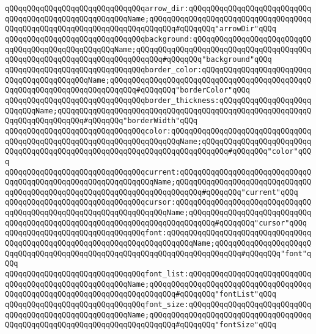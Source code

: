 \verb|qQQqqQQqqQQqqQQqqQQqqQQqqQQqqQQqarrow_dir:qQQqqQQqqQQqqQQqqQQqqQQqqQQqqQQqqQQqqQQqqQQqqQQqqQQqqQQqName;qQQqqQQqqQQqqQQqqQQqqQQqqQQqqQQqqQQqqQQqqQQqqQQqqQQqqQQqqQQqqQQqqQQqqQQqqQQq#qQQqqQQq"arrowDir"qQQq|\newline
\newline
\verb|qQQqqQQqqQQqqQQqqQQqqQQqqQQqqQQqbackground:qQQqqQQqqQQqqQQqqQQqqQQqqQQqqQQqqQQqqQQqqQQqqQQqqQQqName;qQQqqQQqqQQqqQQqqQQqqQQqqQQqqQQqqQQqqQQqqQQqqQQqqQQqqQQqqQQqqQQqqQQqqQQqqQQq#qQQqqQQq"background"qQQq|\newline
\verb|qQQqqQQqqQQqqQQqqQQqqQQqqQQqqQQqborder_color:qQQqqQQqqQQqqQQqqQQqqQQqqQQqqQQqqQQqqQQqqQQqName;qQQqqQQqqQQqqQQqqQQqqQQqqQQqqQQqqQQqqQQqqQQqqQQqqQQqqQQqqQQqqQQqqQQqqQQqqQQq#qQQqqQQq"borderColor"qQQq|\newline
\verb|qQQqqQQqqQQqqQQqqQQqqQQqqQQqqQQqborder_thickness:qQQqqQQqqQQqqQQqqQQqqQQqqQQqName;qQQqqQQqqQQqqQQqqQQqqQQqqQQqqQQqqQQqqQQqqQQqqQQqqQQqqQQqqQQqqQQqqQQqqQQqqQQq#qQQqqQQq"borderWidth"qQQq|\newline
\newline
\verb|qQQqqQQqqQQqqQQqqQQqqQQqqQQqqQQqcolor:qQQqqQQqqQQqqQQqqQQqqQQqqQQqqQQqqQQqqQQqqQQqqQQqqQQqqQQqqQQqqQQqqQQqqQQqName;qQQqqQQqqQQqqQQqqQQqqQQqqQQqqQQqqQQqqQQqqQQqqQQqqQQqqQQqqQQqqQQqqQQqqQQqqQQq#qQQqqQQq"color"qQQq|\newline
\verb|qQQqqQQqqQQqqQQqqQQqqQQqqQQqqQQqcurrent:qQQqqQQqqQQqqQQqqQQqqQQqqQQqqQQqqQQqqQQqqQQqqQQqqQQqqQQqqQQqqQQqName;qQQqqQQqqQQqqQQqqQQqqQQqqQQqqQQqqQQqqQQqqQQqqQQqqQQqqQQqqQQqqQQqqQQqqQQqqQQq#qQQqqQQq"current"qQQq|\newline
\verb|qQQqqQQqqQQqqQQqqQQqqQQqqQQqqQQqcursor:qQQqqQQqqQQqqQQqqQQqqQQqqQQqqQQqqQQqqQQqqQQqqQQqqQQqqQQqqQQqqQQqqQQqName;qQQqqQQqqQQqqQQqqQQqqQQqqQQqqQQqqQQqqQQqqQQqqQQqqQQqqQQqqQQqqQQqqQQqqQQqqQQq#qQQqqQQq"cursor"qQQq|\newline
\newline
\verb|qQQqqQQqqQQqqQQqqQQqqQQqqQQqqQQqfont:qQQqqQQqqQQqqQQqqQQqqQQqqQQqqQQqqQQqqQQqqQQqqQQqqQQqqQQqqQQqqQQqqQQqqQQqqQQqName;qQQqqQQqqQQqqQQqqQQqqQQqqQQqqQQqqQQqqQQqqQQqqQQqqQQqqQQqqQQqqQQqqQQqqQQqqQQq#qQQqqQQq"font"qQQq|\newline
\verb|qQQqqQQqqQQqqQQqqQQqqQQqqQQqqQQqfont_list:qQQqqQQqqQQqqQQqqQQqqQQqqQQqqQQqqQQqqQQqqQQqqQQqqQQqqQQqName;qQQqqQQqqQQqqQQqqQQqqQQqqQQqqQQqqQQqqQQqqQQqqQQqqQQqqQQqqQQqqQQqqQQqqQQqqQQq#qQQqqQQq"fontList"qQQq|\newline
\verb|qQQqqQQqqQQqqQQqqQQqqQQqqQQqqQQqfont_size:qQQqqQQqqQQqqQQqqQQqqQQqqQQqqQQqqQQqqQQqqQQqqQQqqQQqqQQqName;qQQqqQQqqQQqqQQqqQQqqQQqqQQqqQQqqQQqqQQqqQQqqQQqqQQqqQQqqQQqqQQqqQQqqQQqqQQq#qQQqqQQq"fontSize"qQQq|\newline
